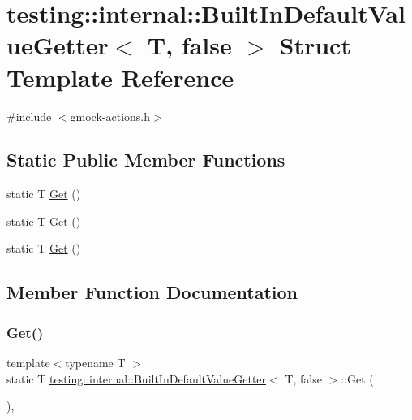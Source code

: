 \hypertarget{structtesting_1_1internal_1_1_built_in_default_value_getter_3_01_t_00_01false_01_4}{}\section{testing\+::internal\+::Built\+In\+Default\+Value\+Getter$<$ T, false $>$ Struct Template Reference}
\label{structtesting_1_1internal_1_1_built_in_default_value_getter_3_01_t_00_01false_01_4}


{\ttfamily \#include $<$gmock-\/actions.\+h$>$}

\subsection*{Static Public Member Functions}
\begin{DoxyCompactItemize}
\item 
static T \mbox{\hyperlink{structtesting_1_1internal_1_1_built_in_default_value_getter_3_01_t_00_01false_01_4_a8c8e929666f61272961eea21a60de4ad}{Get}} ()
\item 
static T \mbox{\hyperlink{structtesting_1_1internal_1_1_built_in_default_value_getter_3_01_t_00_01false_01_4_a8c8e929666f61272961eea21a60de4ad}{Get}} ()
\item 
static T \mbox{\hyperlink{structtesting_1_1internal_1_1_built_in_default_value_getter_3_01_t_00_01false_01_4_a8c8e929666f61272961eea21a60de4ad}{Get}} ()
\end{DoxyCompactItemize}


\subsection{Member Function Documentation}
\mbox{\label{structtesting_1_1internal_1_1_built_in_default_value_getter_3_01_t_00_01false_01_4_a8c8e929666f61272961eea21a60de4ad}} 
\subsubsection{\texorpdfstring{Get()}{Get()}\hspace{0.1cm}{\footnotesize\ttfamily [1/3]}}
{\footnotesize\ttfamily template$<$typename T $>$ \\
static T \mbox{\hyperlink{structtesting_1_1internal_1_1_built_in_default_value_getter}{testing\+::internal\+::\+Built\+In\+Default\+Value\+Getter}}$<$ T, false $>$\+::Get (\begin{DoxyParamCaption}{ }\end{DoxyParamCaption})\hspace{0.3cm}{\ttfamily [inline]}, {\ttfamily [static]}}

